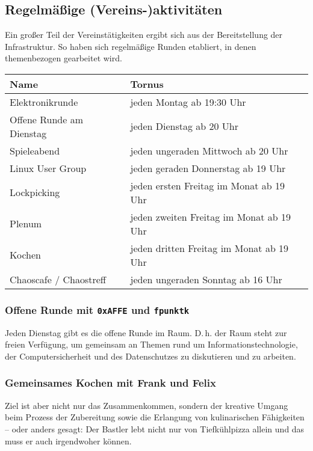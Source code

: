 \documentclass[10pt,DIV16]{scrartcl}
\begin{document}
\subsection{Regelmäßige (Vereins-)aktivitäten}

Ein großer Teil der Vereinstätigkeiten ergibt sich aus der
Bereitstellung der Infrastruktur. So haben sich regelmäßige Runden
etabliert, in denen themenbezogen gearbeitet wird.

\begin{table}[h]
	\begin{tabular}{l|l}
		Name   &  Tornus \\ \hline
		Elektronikrunde   &  jeden Montag ab 19:30 Uhr\\
		Offene Runde am Dienstag   &  jeden Dienstag ab 20 Uhr\\
		Spieleabend   &  jeden ungeraden Mittwoch ab 20 Uhr\\
		Linux User Group   &  jeden geraden Donnerstag ab 19 Uhr\\
		Lockpicking   &  jeden ersten Freitag im Monat ab 19 Uhr\\
		Plenum   &  jeden zweiten Freitag im Monat ab 19 Uhr\\
		Kochen   &  jeden dritten Freitag im Monat ab 19 Uhr\\
		Chaoscafe / Chaostreff   &  jeden ungeraden Sonntag ab 16 Uhr\\
\end{tabular}
\end{table}

\subsubsection{Offene Runde mit \texttt{0xAFFE} und \texttt{fpunktk}}

Jeden Dienstag gibt es die offene Runde im Raum. D.\,h. der Raum
steht zur freien Verfügung, um gemeinsam an Themen rund um
Informationstechnologie, der Computersicherheit und des
Datenschutzes zu diskutieren und zu arbeiten.

\subsubsection{Gemeinsames Kochen mit Frank und Felix}

Ziel ist aber nicht nur das Zusammenkommen, sondern der kreative Umgang
beim Prozess der Zubereitung sowie die Erlangung von kulinarischen
Fähigkeiten -- oder anders gesagt: Der Bastler lebt nicht nur von
Tiefkühlpizza allein und das muss er auch irgendwoher können.
\end{document}
